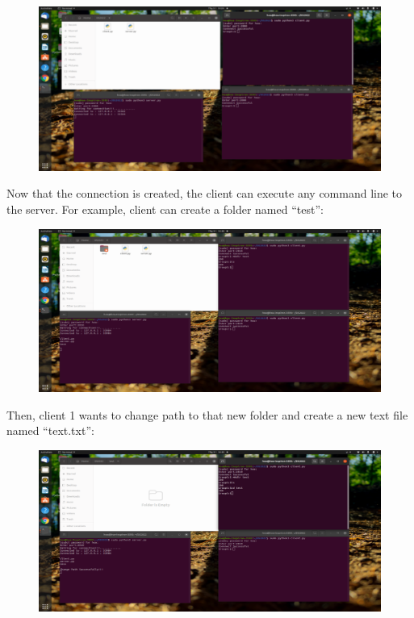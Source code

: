 \begin{figure}[h]
\centering
\includegraphics{images/result_3.png}
\end{figure}
\newpage
\hspace{0.7cm}Now that the connection is created, the client can execute any command line to the server. For example, client can create a folder named “test”:


\begin{figure}[h]
\centering
\includegraphics{images/result_4.png}
\end{figure}

\hspace{0.7cm}Then, client 1 wants to change path to that new folder and create a new text file named “text.txt”:

\begin{figure}[h]
\centering
\includegraphics{images/result_5.png}
\end{figure}

